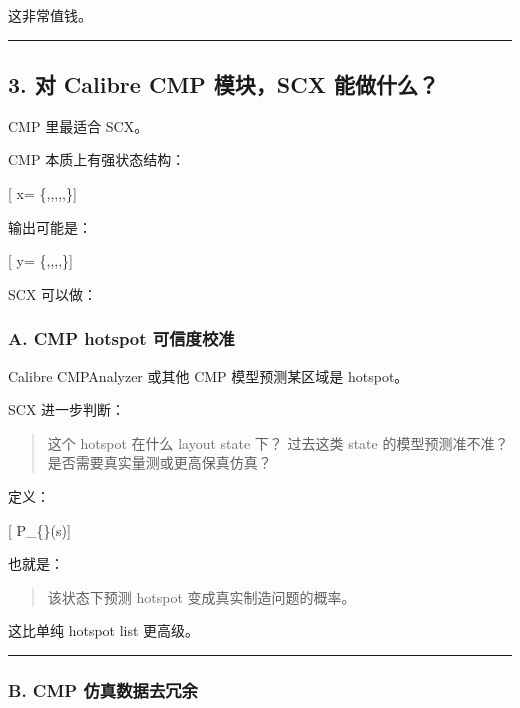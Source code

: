 \documentclass[
  12pt,
]{ctexart}
\begin{document}
这非常值钱。

\begin{center}\rule{0.5\linewidth}{0.5pt}\end{center}

\subsection{3. 对 Calibre CMP 模块，SCX
能做什么？}\label{ux5bf9-calibre-cmp-ux6a21ux5757scx-ux80fdux505aux4ec0ux4e48}

CMP 里最适合 SCX。

CMP 本质上有强状态结构：

{[} x=
\{,,,,,\}{]}

输出可能是：

{[} y=
\{,,,,\}{]}

SCX 可以做：

\subsubsection{A. CMP hotspot
可信度校准}\label{a.-cmp-hotspot-ux53efux4fe1ux5ea6ux6821ux51c6}

Calibre CMPAnalyzer 或其他 CMP 模型预测某区域是 hotspot。

SCX 进一步判断：

\begin{quote}
这个 hotspot 在什么 layout state 下？ 过去这类 state 的模型预测准不准？
是否需要真实量测或更高保真仿真？
\end{quote}

定义：

{[} P\_\{\}(\mid s){]}

也就是：

\begin{quote}
该状态下预测 hotspot 变成真实制造问题的概率。
\end{quote}

这比单纯 hotspot list 更高级。

\begin{center}\rule{0.5\linewidth}{0.5pt}\end{center}

\subsubsection{B. CMP
仿真数据去冗余}\label{b.-cmp-ux4effux771fux6570ux636eux53bbux5197ux4f59}
\end{document}
